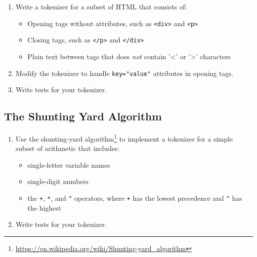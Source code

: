 \documentclass{scrbook}
\newcommand{\hreffoot}[2]{{#1}\footnote{\href{#2}{#2}}}
\begin{document}
\begin{enumerate}

\item 

Write a tokenizer for a subset of HTML that consists of:

\begin{itemize}

\item Opening tags without attributes, such as \texttt{<div>} and \texttt{<p>}

\item Closing tags, such as \texttt{</p>} and \texttt{</div>}

\item Plain text between tags that does \emph{not} contain '<' or '>' characters

\end{itemize}



\item 

Modify the tokenizer to handle \texttt{key="value"} attributes in opening tags.



\item 

Write tests for your tokenizer.



\end{enumerate}

\subsection*{The Shunting Yard Algorithm}

\begin{enumerate}

\item 

Use the \hreffoot{shunting-yard algorithm}{https://en.wikipedia.org/wiki/Shunting-yard\_algorithm}
    to implement a tokenizer for a simple subset of arithmetic that includes:

\begin{itemize}

\item single-letter variable names

\item single-digit numbers

\item the \texttt{+}, \texttt{*}, and \texttt{{\textasciicircum}} operators, where \texttt{+} has the lowest precedence and \texttt{{\textasciicircum}} has the highest

\end{itemize}



\item 

Write tests for your tokenizer.



\end{enumerate}
\end{document}

